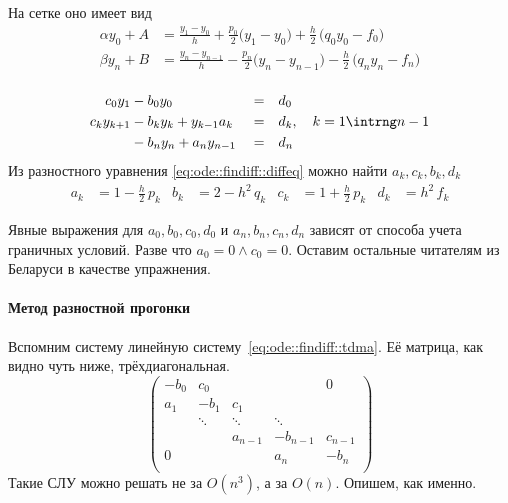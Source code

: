 \documentclass{trlnotes}
\begin{document}
\begin{enumerate}
        На сетке оно имеет вид
        \begin{equation*}
          \begin{split}
            α y_0 + A &= \frac{y_1 - y_{0}}{h} + \frac{p_0}{2} \biggl(y_1 - y_{0}\biggr)
            + \frac{h}{2}\,\biggl(q_0 y_0 - f_0\biggr) \\
            β y_n + B &= \frac{y_n - y_{n-1}}{h} - \frac{p_n}{2} \biggl(y_n - y_{n-1}\biggr)
            - \frac{h}{2}\,\biggl(q_n y_n - f_n\biggr) \\
            \end{split}
        \end{equation*}
\end{enumerate}

\begin{equation}\label{eq:ode::findiff::tdma}
  \begin{aligned}
    c_0 y_1     &- b_0 y_0                  &&=& &d_0 \\
    c_k y_{k+1} &- b_k y_k+ y_{k-1} a_k     &&=& &d_k,\quad k= 1\intrng n-1 \\
                &- b_n y_n + a_n y_{n-1}    &&=& &d_n 
  \end{aligned}
\end{equation}
Из разностного уравнения \eqref{eq:ode::findiff::diffeq} можно найти $a_k, c_k, b_k, d_k$
\[
  \begin{aligned}
    a_k &= 1- \tfrac{h}2 \, p_k &
    b_k &= 2- h^2 \, q_k &
    c_k &= 1+ \tfrac{h}2 \, p_k &
    d_k &= {h}^2 \, f_k 
  \end{aligned}
\]

Явные выражения для $a_0, b_0, c_0, d_0$ и $a_n, b_n, c_n, d_n$
зависят от способа учета граничных условий. Разве что $a_0 = 0\land c_0 = 0$.
Оставим остальные читателям из Беларуси в качестве упражнения.

\paragraph{Метод разностной прогонки}
\label{par:ode::fintdma}
Вспомним систему линейную систему~\ref{eq:ode::findiff::tdma}.
Её матрица, как видно чуть ниже, трёхдиагональная.
\[
  \begin{pmatrix}
    -b_0   & c_0    &         &          & 0       \\
    a_1    & -b_1   & c_1     &          &         \\
           & \ddots & \ddots  & \ddots             \\
           &        & a_{n-1} & -b_{n-1} & c_{n-1} \\
    0      &        &         & a_n      & -b_n    \\
  \end{pmatrix}
\]
Такие СЛУ можно решать не за $O(n^3)$, а за $O(n)$. Опишем, как именно.
\end{document}
